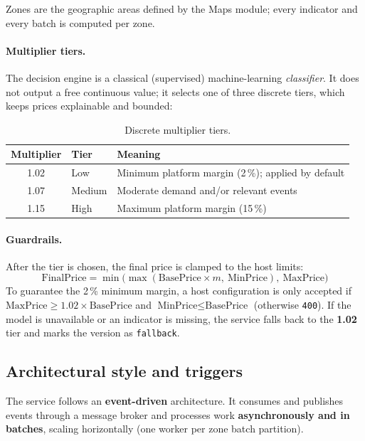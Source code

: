 \documentclass[11pt,a4paper]{article}
\begin{document}
Zones are the geographic areas defined by the Maps module; every indicator
and every batch is computed per zone.

\paragraph{Multiplier tiers.}
The decision engine is a classical (supervised) machine-learning
\emph{classifier}. It does not output a free continuous value; it selects one
of three discrete tiers, which keeps prices explainable and bounded:

\begin{table}[H]
  \centering
  \begin{tabular}{@{}cll@{}}
    \toprule
    \textbf{Multiplier} & \textbf{Tier} & \textbf{Meaning} \\
    \midrule
    1.02 & Low    & Minimum platform margin (2\,\%); applied by default \\
    1.07 & Medium & Moderate demand and/or relevant events \\
    1.15 & High   & Maximum platform margin (15\,\%) \\
    \bottomrule
  \end{tabular}
  \caption{Discrete multiplier tiers.}
\end{table}

\paragraph{Guardrails.} After the tier is chosen, the final price is clamped
to the host limits:
\[
  \text{FinalPrice} = \min\bigl(\max(\text{BasePrice}\times m,\ \text{MinPrice}),\ \text{MaxPrice}\bigr)
\]
To guarantee the 2\,\% minimum margin, a host configuration is only accepted
if $\text{MaxPrice} \geq 1.02 \times \text{BasePrice}$ and
$\text{MinPrice} \leq \text{BasePrice}$ (otherwise \texttt{400}). If the
model is unavailable or an indicator is missing, the service falls back to
the \textbf{1.02} tier and marks the version as \texttt{fallback}.

\subsection{Architectural style and triggers}
The service follows an \textbf{event-driven} architecture. It consumes and
publishes events through a message broker and processes work
\textbf{asynchronously and in batches}, scaling horizontally (one worker per
zone batch partition).
\end{document}
